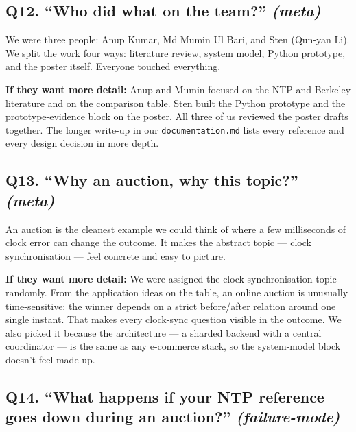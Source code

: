 \documentclass[a4paper,11pt]{article}
\begin{document}
\subsection{Q12. ``Who did what on the team?'' \textnormal{\small\itshape (meta)}}

\begin{shortans}
We were three people: Anup Kumar, Md Mumin Ul Bari, and Sten
(Qun-yan Li). We split the work four ways: literature review,
system model, Python prototype, and the poster itself. Everyone
touched everything.
\end{shortans}

\begin{deepans}
\textbf{If they want more detail:} Anup and Mumin focused on the
NTP and Berkeley literature and on the comparison table. Sten
built the Python prototype and the prototype-evidence block on the
poster. All three of us reviewed the poster drafts together. The
longer write-up in our \texttt{documentation.md} lists every
reference and every design decision in more depth.
\end{deepans}

\subsection{Q13. ``Why an auction, why this topic?'' \textnormal{\small\itshape (meta)}}

\begin{shortans}
An auction is the cleanest example we could think of where a few
milliseconds of clock error can change the outcome. It makes the
abstract topic --- clock synchronisation --- feel concrete and easy
to picture.
\end{shortans}

\begin{deepans}
\textbf{If they want more detail:} We were assigned the
clock-synchronisation topic randomly. From the application ideas
on the table, an online auction is unusually time-sensitive: the
winner depends on a strict before/after relation around one
single instant. That makes every clock-sync question visible in
the outcome. We also picked it because the architecture --- a
sharded backend with a central coordinator --- is the same as any
e-commerce stack, so the system-model block doesn't feel made-up.
\end{deepans}

\subsection{Q14. ``What happens if your NTP reference goes down during an auction?'' \textnormal{\small\itshape (failure-mode)}}
\end{document}
